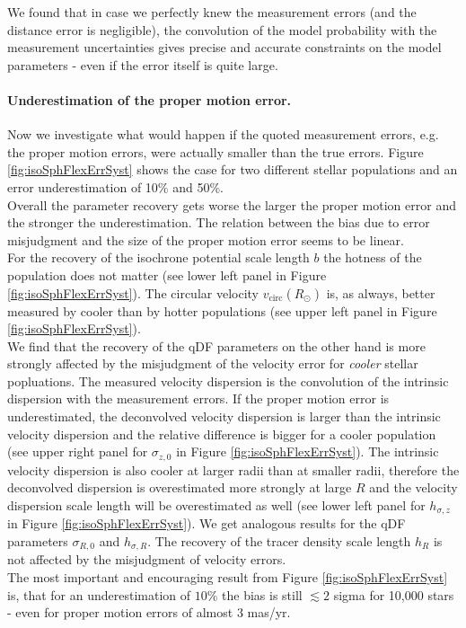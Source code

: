 We found that in case we perfectly knew the measurement errors (and the distance error is negligible), the convolution of the model probability with the measurement uncertainties gives precise and accurate constraints on the model parameters - even if the error itself is quite large.



\paragraph{Underestimation of the proper motion error.}  Now we investigate what would happen if the quoted measurement errors, e.g. the proper motion errors, were actually smaller than the true errors. Figure \ref{fig:isoSphFlexErrSyst} shows the case for two different stellar populations and an error underestimation of 10\% and 50\%. 
\\Overall the parameter recovery gets worse the larger the proper motion error and the stronger the underestimation. The relation between the bias due to error misjudgment and the size of the proper motion error seems to be linear.
\\For the recovery of the isochrone potential scale length $b$ the hotness of the population does not matter (see lower left panel in Figure \ref{fig:isoSphFlexErrSyst}). The circular velocity $v_\text{circ}(R_\odot)$ is, as always, better measured by cooler than by hotter populations (see upper left panel in Figure \ref{fig:isoSphFlexErrSyst}). 
\\We find that the recovery of the qDF parameters on the other hand is more strongly affected by the misjudgment of the velocity error for \emph{cooler} stellar popluations. The measured velocity dispersion is the convolution of the intrinsic dispersion with the measurement errors. If the proper motion error is underestimated, the deconvolved velocity dispersion is larger than the intrinsic velocity dispersion and the relative difference is bigger for a cooler population (see upper right panel for $\sigma_{z,0}$ in Figure \ref{fig:isoSphFlexErrSyst}). The intrinsic velocity dispersion is also cooler at larger radii than at smaller radii, therefore the deconvolved dispersion is overestimated more strongly at large $R$ and the velocity dispersion scale length will be overestimated as well (see lower left panel for $h_{\sigma,z}$ in Figure \ref{fig:isoSphFlexErrSyst}). We get analogous results for the qDF parameters $\sigma_{R,0}$ and $h_{\sigma,R}$. The recovery of the tracer density scale length $h_R$ is not affected by the misjudgment of velocity errors. 
\\The most important and encouraging result from Figure \ref{fig:isoSphFlexErrSyst} is, that for an underestimation of $10\%$ the bias is still $\lesssim 2$ sigma for 10,000 stars \Wilma{[TO DO: Check]} - even for proper motion errors of almost $3$ mas/yr.

